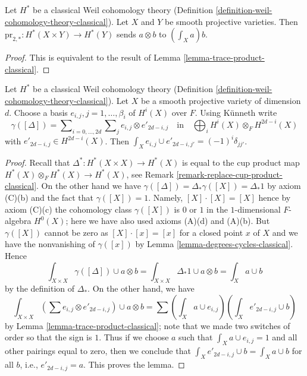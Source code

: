 \begin{lemma}
\label{lemma-pr2star-classical}
Let $H^*$ be a classical Weil cohomology theory
(Definition \ref{definition-weil-cohomology-theory-classical}).
Let $X$ and $Y$ be smooth projective varieties.
Then $\text{pr}_{2, *} : H^*(X \times Y) \to H^*(Y)$
sends $a \otimes b$ to $(\int_X a) b$.
\end{lemma}

\begin{proof}
This is equivalent to the result of Lemma \ref{lemma-trace-product-classical}.
\end{proof}

\begin{lemma}
\label{lemma-class-diagonal-classical}
Let $H^*$ be a classical Weil cohomology theory
(Definition \ref{definition-weil-cohomology-theory-classical}).
Let $X$ be a smooth projective variety of dimension $d$.
Choose a basis $e_{i, j}, j = 1, \ldots, \beta_i$ of $H^i(X)$ over $F$.
Using K\"unneth write
$$
\gamma([\Delta]) =
\sum\nolimits_{i = 0, \ldots, 2d}
\sum\nolimits_j e_{i, j} \otimes e'_{2d - i , j}
\quad\text{in}\quad
\bigoplus\nolimits_i H^i(X) \otimes_F H^{2d - i}(X)
$$
with $e'_{2d - i, j} \in H^{2d - i}(X)$.
Then $\int_X e_{i, j} \cup e'_{2d - i, j'} = (-1)^i\delta_{jj'}$.
\end{lemma}

\begin{proof}
Recall that $\Delta^* : H^*(X \times X) \to H^*(X)$ is equal to the
cup product map $H^*(X) \otimes_F H^*(X) \to H^*(X)$, see
Remark \ref{remark-replace-cup-product-classical}. On the other hand we have
$\gamma([\Delta]) = \Delta_*\gamma([X]) = \Delta_*1$ by
axiom (C)(b) and the fact that $\gamma([X]) = 1$. Namely,
$[X] \cdot [X] = [X]$ hence by axiom (C)(c) the cohomology class
$\gamma([X])$ is $0$ or $1$ in the $1$-dimensional $F$-algebra $H^0(X)$;
here we have also used axioms (A)(d) and (A)(b).
But $\gamma([X])$ cannot be zero as $[X] \cdot [x] = [x]$
for a closed point $x$ of $X$ and we have the nonvanishing
of $\gamma([x])$ by Lemma \ref{lemma-degrees-cycles-classical}.
Hence
$$
\int_{X \times X} \gamma([\Delta]) \cup a \otimes b =
\int_{X \times X} \Delta_*1 \cup a \otimes b =
\int_X a \cup b
$$
by the definition of $\Delta_*$. On the other hand, we have
$$
\int_{X \times X} (\sum e_{i, j} \otimes e'_{2d -i , j}) \cup a \otimes b =
\sum (\int_X a \cup e_{i, j})(\int_X e'_{2d - i, j} \cup b)
$$
by Lemma \ref{lemma-trace-product-classical}; note that we made
two switches of order so that the sign is $1$.
Thus if we choose $a$ such that $\int_X a \cup e_{i, j} = 1$
and all other pairings equal to zero, then we conclude that
$\int_X e'_{2d - i, j} \cup b = \int_X a \cup b$ for all $b$, i.e.,
$e'_{2d - i, j} = a$. This proves the lemma.
\end{proof}

